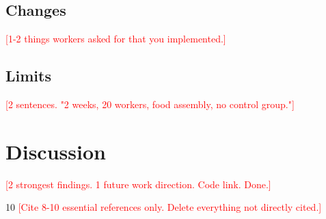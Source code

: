 \documentclass[10pt,twocolumn]{article}
\newcommand{\need}[1]{\textcolor{red}{[#1]}}
\begin{document}
\subsection{Changes}

\need{1-2 things workers asked for that you implemented.}

\subsection{Limits}

\need{2 sentences. "2 weeks, 20 workers, food assembly, no control group."}

\section{Discussion}

\need{2 strongest findings. 1 future work direction. Code link. Done.}

\begin{thebibliography}{10}
\need{Cite 8-10 essential references only. Delete everything not directly cited.}
\end{thebibliography}
\end{document}
